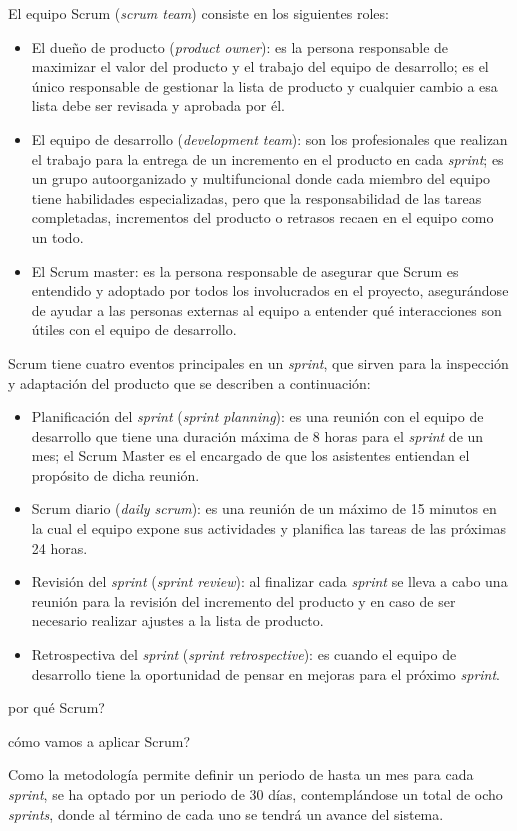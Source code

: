El equipo Scrum (\textit{scrum team}) consiste en los siguientes roles:
\begin{itemize}
	\item El dueño de producto (\textit{product owner}): es la persona responsable de maximizar el valor del producto y el trabajo del equipo de desarrollo; es el único responsable de gestionar la lista de producto y cualquier cambio a esa lista debe ser revisada y aprobada por él.
	\item El equipo de desarrollo (\textit{development team}): son los profesionales que realizan el trabajo para la entrega de un incremento en el producto en cada \textit{sprint}; es un grupo autoorganizado y multifuncional donde cada miembro del equipo tiene habilidades especializadas, pero que la responsabilidad de las tareas completadas, incrementos del producto o retrasos recaen en el equipo como un todo.
	\item  El Scrum master: es la persona responsable de asegurar que Scrum es entendido y adoptado por todos los involucrados en el proyecto, asegurándose de ayudar a las personas externas al equipo a entender qué interacciones son útiles con el equipo de desarrollo.
\end{itemize}


Scrum tiene cuatro eventos principales en  un \textit{sprint}, que sirven para la inspección y adaptación del producto que se describen a continuación:
\begin{itemize}
	\item Planificación del \textit{sprint} (\textit{sprint planning}): es una reunión con el equipo de desarrollo que tiene una duración máxima de 8 horas para el \textit{sprint} de un mes; el Scrum Master es el encargado de que los asistentes entiendan el propósito de dicha reunión.
	\item Scrum diario (\textit{daily scrum}): es una reunión de un máximo de 15 minutos en la cual el equipo expone sus actividades y planifica las tareas de las próximas 24 horas.
	\item Revisión del \textit{sprint} (\textit{sprint review}): al finalizar cada \textit{sprint} se lleva a cabo una reunión para la revisión del incremento del producto y en caso de ser necesario realizar ajustes a la lista de producto.
	\item Retrospectiva del \textit{sprint} (\textit{sprint retrospective}): es cuando el equipo de desarrollo tiene la oportunidad de pensar en mejoras para el próximo \textit{sprint}.
\end{itemize}

por qué Scrum?

cómo vamos a aplicar Scrum?

Como la metodología permite definir un periodo de hasta un mes para cada \textit{sprint}, se ha optado por un periodo de 30 días, contemplándose un total de ocho \textit{sprints}, donde al término de cada uno se tendrá un avance del sistema.